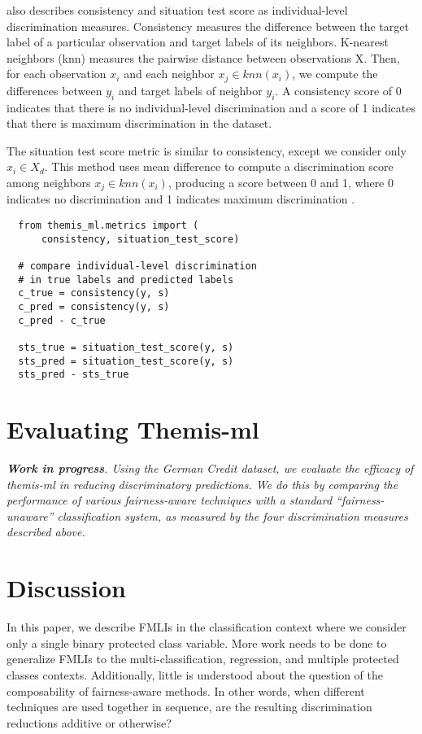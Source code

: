 \documentclass{acm_proc_article-sp}
\begin{document}
\cite{zliobaite2015survey} also describes consistency and situation test score
as individual-level discrimination measures. Consistency measures the difference
between the target label of a particular observation and target labels of its
neighbors. K-nearest neighbors (knn) measures the pairwise distance between
observations X. Then, for each observation \(x_i\) and each neighbor \(x_j \in
knn(x_i)\), we compute the differences between \(y_i\) and target labels of
neighbor \(y_i\). A consistency score of 0 indicates that there is no
individual-level discrimination and a score of 1 indicates that there is maximum
discrimination in the dataset.

The situation test score metric is similar to consistency, except we consider
only \(x_i \in X_d\). This method uses mean difference to compute a
discrimination score among neighbors \(x_j \in knn(x_i)\), producing a score
between 0 and 1, where 0 indicates no discrimination and 1 indicates maximum
discrimination \cite{zliobaite2015survey}.

\begin{verbatim}
  from themis_ml.metrics import (
      consistency, situation_test_score)

  # compare individual-level discrimination
  # in true labels and predicted labels
  c_true = consistency(y, s)
  c_pred = consistency(y, s)
  c_pred - c_true

  sts_true = situation_test_score(y, s)
  sts_pred = situation_test_score(y, s)
  sts_pred - sts_true
\end{verbatim}

\section{Evaluating Themis-ml}

\emph{\textbf{Work in progress}. Using the German Credit dataset, we evaluate
the efficacy of themis-ml in reducing discriminatory predictions. We do this by
comparing the performance of various fairness-aware techniques with a standard
``fairness- unaware'' classification system, as measured by the four
discrimination measures described above.}

\section{Discussion}

In this paper, we describe FMLIs in the classification context where we consider
only a single binary protected class variable. More work needs to be done to
generalize FMLIs to the multi-classification, regression, and multiple protected
classes contexts. Additionally, little is understood about the question of the
composability of fairness-aware methods. In other words, when different
techniques are used together in sequence, are the resulting discrimination
reductions additive or otherwise?
\end{document}
